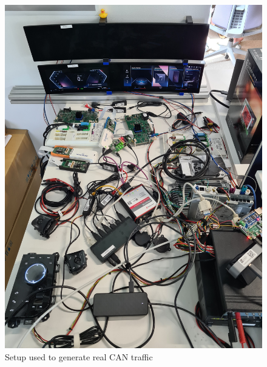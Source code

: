 \begin{figure}
    \centering
    \includegraphics[angle = -90, origin = c, width = .3\linewidth]{img/parts/app/Setup.jpg}
    \caption{Setup used to generate real CAN traffic}
    \label{fig:setup}
\end{figure}